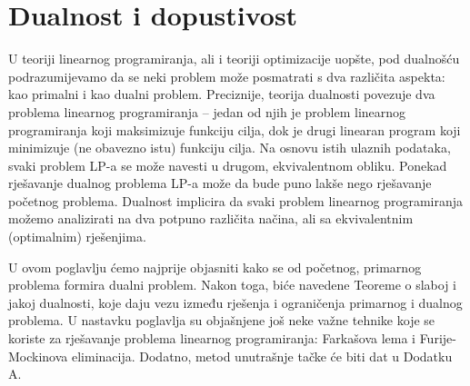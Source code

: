 \documentclass[b5paper, utf8, 11pt, colorlinks]{book}
\theoremstyle{definition}
\begin{document}

 \chapter{Dualnost i dopustivost}\label{chp:dualnost}

 U teoriji linearnog programiranja, ali i teoriji optimizacije uopšte, pod dualnošću podrazumijevamo da se neki problem može posmatrati s dva različita aspekta: kao primalni i kao dualni problem. 
 Preciznije, teorija dualnosti povezuje dva problema linearnog programiranja -- jedan od njih je problem linearnog programiranja koji maksimizuje funkciju cilja, dok je drugi linearan program  koji minimizuje (ne obavezno istu) funkciju cilja.  Na osnovu istih ulaznih podataka, svaki problem LP-a se može navesti u drugom, ekvivalentnom obliku. Ponekad rješavanje dualnog problema LP-a može da bude puno lakše nego rješavanje početnog problema.  Dualnost implicira da svaki problem linearnog programiranja možemo analizirati na dva potpuno različita načina, ali sa ekvivalentnim (optimalnim) rješenjima. 

U ovom poglavlju ćemo najprije objasniti kako se od početnog, primarnog problema formira dualni problem. Nakon toga, biće navedene Teoreme o slaboj i jakoj dualnosti, koje daju vezu između rješenja i ograničenja primarnog i dualnog problema. U nastavku poglavlja su objašnjene još neke važne tehnike koje se koriste za rješavanje problema linearnog programiranja: Farkašova lema i Furije-Mockinova eliminacija. Dodatno, metod unutrašnje tačke će biti dat u Dodatku A. 
\end{document}
